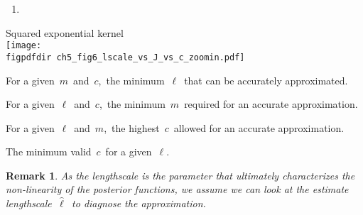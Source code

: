 \documentclass[landscape,a1,final]{a0poster} %
\newtheorem*{remark}{Remark}
\let\tempone\itemize
\let\temptwo\enditemize
\renewenvironment{itemize}{\tempone\addtolength{\itemsep}{-0.3\baselineskip}}{\temptwo}
\def\figpdfdir{fig/} %
\begin{document}
\begin{minipage}{1\linewidth}
\begin{minipage}[t]{0.31\textwidth}
\begin{enumerate}
\vspace{-3mm}
\item {}
\end{enumerate}

\vspace{3mm}
\hspace{-1cm}
\begin{minipage}{0.35\textwidth}
\hspace{0.25\textwidth} \scriptsize Squared exponential kernel\\
\texttt{[image: \\figpdfdir ch5\_fig6\_lscale\_vs\_J\_vs\_c\_zoomin.pdf]} \;\;

\end{minipage}
\begin{minipage}{0.65\textwidth}

\centering
\begin{tcolorbox}[colframe=blue!20, colback=white, title={\scriptsize This model says...}, colbacktitle=lightblue, coltitle=black, boxrule=0.5pt, width=0.975\textwidth]
\begin{itemize}\setlength\itemsep{1mm}
\item For a given\, $m$\, and\, $c$,\, the minimum\, $\ell$\, that can be accurately approximated.
\item For a given\, $\ell$\, and\, $c$,\, the minimum\, $m$\, required for an accurate approximation.
\item For a given\, $\ell$\, and\, $m$,\, the highest\, $c$\, allowed for an accurate approximation.
\item The minimum valid\, $c$\, for a given\, $\ell$.
\end{itemize}
\end{tcolorbox}
\end{minipage}

\vspace{-3mm}
{\centering
\begin{tcolorbox}[colframe=blue!20, colback=white, title={\scriptsize This model serves as a \textsc{\textbf{diagnosis tool}} of the approximation:}, colbacktitle=lightblue, coltitle=black, boxrule=0.5pt, width=0.98\textwidth]
\begin{remark}
As the lengthscale is the parameter that ultimately characterizes the non-linearity of the posterior functions, we assume we can look at the {\color{navyblue} estimate lengthscale}\, $\hat{\ell}$\, to diagnose the approximation.
\end{remark}


\end{tcolorbox}}
\end{minipage}
\end{minipage}
\end{document}
